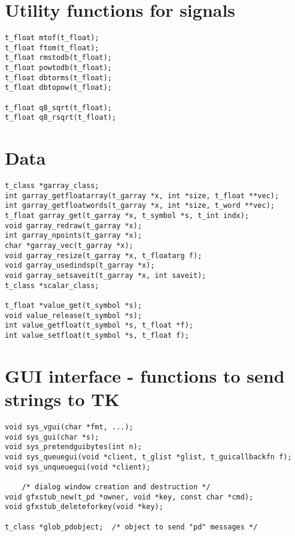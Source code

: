 \section{Utility functions for signals}
\begin{lstlisting}
t_float mtof(t_float);
t_float ftom(t_float);
t_float rmstodb(t_float);
t_float powtodb(t_float);
t_float dbtorms(t_float);
t_float dbtopow(t_float);

t_float q8_sqrt(t_float);
t_float q8_rsqrt(t_float);
\end{lstlisting}

\section{Data}
\begin{lstlisting}
t_class *garray_class;
int garray_getfloatarray(t_garray *x, int *size, t_float **vec);
int garray_getfloatwords(t_garray *x, int *size, t_word **vec);
t_float garray_get(t_garray *x, t_symbol *s, t_int indx);
void garray_redraw(t_garray *x);
int garray_npoints(t_garray *x);
char *garray_vec(t_garray *x);
void garray_resize(t_garray *x, t_floatarg f);
void garray_usedindsp(t_garray *x);
void garray_setsaveit(t_garray *x, int saveit);
t_class *scalar_class;

t_float *value_get(t_symbol *s);
void value_release(t_symbol *s);
int value_getfloat(t_symbol *s, t_float *f);
int value_setfloat(t_symbol *s, t_float f);
\end{lstlisting}

\section{GUI interface - functions to send strings to TK}
\begin{lstlisting}
void sys_vgui(char *fmt, ...);
void sys_gui(char *s);
void sys_pretendguibytes(int n);
void sys_queuegui(void *client, t_glist *glist, t_guicallbackfn f);
void sys_unqueuegui(void *client);

    /* dialog window creation and destruction */
void gfxstub_new(t_pd *owner, void *key, const char *cmd);
void gfxstub_deleteforkey(void *key);

t_class *glob_pdobject;  /* object to send "pd" messages */

\end{lstlisting}

